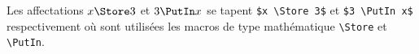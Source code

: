 Les affectations $x \Store 3$ et $3 \PutIn x$ se tapent \verb+$x \Store 3$+ et \verb+$3 \PutIn x$+ respectivement où sont utilisées les macros de type mathématique \verb+\Store+ et \verb+\PutIn+.
